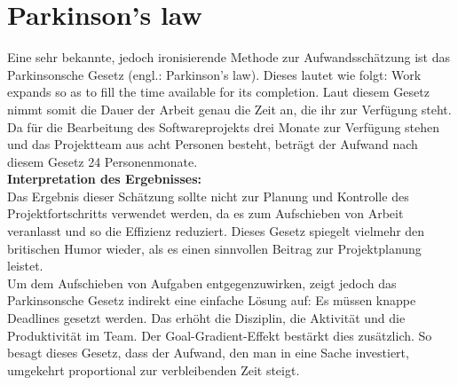 \documentclass[../review_1.tex]{subfiles}
\begin{document}
\section{Parkinson's law}
Eine sehr bekannte, jedoch ironisierende Methode zur Aufwandsschätzung ist das Parkinsonsche Gesetz (engl.: \glqq Parkinson's law\grqq). Dieses lautet wie folgt: \glqq Work expands so as to fill the time available for its completion\grqq. Laut diesem Gesetz nimmt somit die Dauer der Arbeit genau die Zeit an, die ihr zur Verfügung steht. \\
Da für die Bearbeitung des Softwareprojekts drei Monate zur Verfügung stehen und das Projektteam aus acht Personen besteht, beträgt der Aufwand nach diesem Gesetz 24 Personenmonate.\\ \newline
\textbf{Interpretation des Ergebnisses:}\\ \newline
Das Ergebnis dieser Schätzung sollte nicht zur Planung und Kontrolle des Projektfortschritts verwendet werden, da es zum Aufschieben von Arbeit veranlasst und so die Effizienz reduziert. Dieses Gesetz spiegelt vielmehr den britischen Humor wieder, als es einen sinnvollen Beitrag zur Projektplanung leistet.\\
Um dem Aufschieben von Aufgaben entgegenzuwirken, zeigt jedoch das Parkinsonsche Gesetz indirekt eine einfache Lösung auf: Es müssen knappe Deadlines gesetzt werden. Das erhöht die Disziplin, die Aktivität und die Produktivität im Team. Der Goal-Gradient-Effekt bestärkt dies zusätzlich. So besagt dieses Gesetz, dass der Aufwand, den man in eine Sache investiert, umgekehrt proportional zur verbleibenden Zeit steigt.
\end{document}
